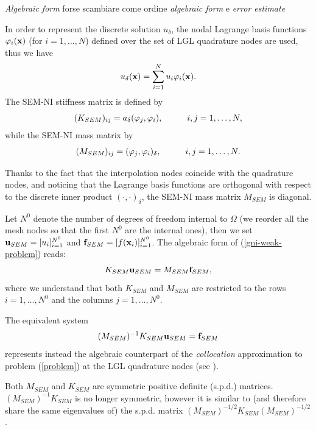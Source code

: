 \documentclass[11pt]{article}
\newcommand{\aq}{\color{blue}}
\begin{document}
\null
\emph{Algebraic form} {\aq forse scambiare come ordine \emph{algebraic form}
e \emph{error estimate}}

In order to represent the discrete solution $u_\delta$, the nodal 
Lagrange basis 
functions $\varphi_i({\bf x})$ (for $i=1,\ldots,N$)
 defined over the set of
LGL quadrature nodes are used,
thus we have
\begin{equation}
u_\delta({\bf x})=\sum_{i=1}^N u_i \varphi_i({\bf x}).
\end{equation}
The SEM-NI stiffness matrix is defined by
\begin{equation}\label{stiff_sem}
(K_{SEM})_{ij}=a_\delta(\varphi_j,\varphi_i), \hskip 1.cm i,j=1,\ldots, N,
\end{equation}
while the SEM-NI mass matrix by
\begin{equation}\label{mass_sem}
(M_{SEM})_{ij}=(\varphi_j,\varphi_i)_\delta, \hskip 1.cm i,j=1,\ldots, N.
\end{equation}

Thanks to the fact that the interpolation nodes coincide with 
the quadrature nodes, and noticing that the Lagrange basis functions 
are orthogonal with respect to the discrete inner product 
$(\cdot,\cdot)_\delta$,  the SEM-NI mass matrix $M_{SEM}$ is diagonal.

Let $N^0$ denote the number of
degrees of freedom internal to $\Omega$ (we reorder all the mesh nodes
 so that
the first $N^0$ are the internal ones), then we set
${\bf u}_{SEM}=[u_i]_{i=1}^{N^0}$ and 
${\bf f}_{SEM}=[f({\bf x}_i)]_{i=1}^{N^0}$.
The algebraic form of (\ref{gni-weak-problem}) reads: 
\begin{equation}\label{algebraic_sem}
K_{SEM}{\bf u}_{SEM}=M_{SEM}{\bf f}_{SEM},
\end{equation}
where we understand that both $K_{SEM}$ and $M_{SEM}$ are 
restricted to the rows $i=1,\ldots, N^0$ and the columns $j=1,\ldots, N^0$.

The equivalent system 
\begin{equation}\label{algebraic_sem_coll}
(M_{SEM})^{-1}K_{SEM}{\bf u}_{SEM}={\bf f}_{SEM}
\end{equation}
represents instead the algebraic counterpart of the \emph{collocation} 
approximation to problem (\ref{problem}) at the LGL quadrature nodes
(see \cite{chqz06}).

Both $M_{SEM}$ and  $K_{SEM}$ are symmetric positive definite (s.p.d.)
matrices.\\
$(M_{SEM})^{-1}K_{SEM}$ is no 
longer symmetric, however it is 
similar to (and therefore share the same eigenvalues of) the  s.p.d. matrix
$(M_{SEM})^{-1/2}K_{SEM}(M_{SEM})^{-1/2}$.
\end{document}
